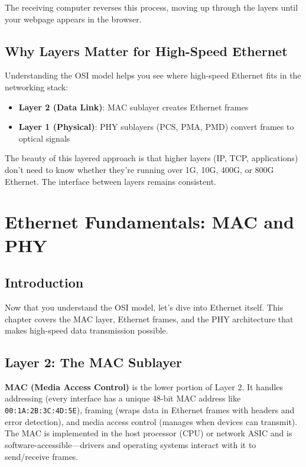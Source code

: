\documentclass[openany]{tufte-book}
\begin{document}
The receiving computer reverses this process, moving up through the layers until your webpage appears in the browser.

\section{Why Layers Matter for High-Speed Ethernet}

Understanding the OSI model helps you see where high-speed Ethernet fits in the networking stack:

\begin{itemize}
\item \textbf{Layer 2 (Data Link)}: MAC sublayer creates Ethernet frames
\item \textbf{Layer 1 (Physical)}: PHY sublayers (PCS, PMA, PMD) convert frames to optical signals
\end{itemize}

The beauty of this layered approach is that higher layers (IP, TCP, applications) don't need to know whether they're running over 1G, 10G, 400G, or 800G Ethernet. The interface between layers remains consistent.


\chapter{Ethernet Fundamentals: MAC and PHY}

\section{Introduction}

Now that you understand the OSI model, let's dive into Ethernet itself. This chapter covers the MAC layer, Ethernet frames, and the PHY architecture that makes high-speed data transmission possible.

\section{Layer 2: The MAC Sublayer}

\textbf{MAC (Media Access Control)} is the lower portion of Layer 2. It handles addressing (every interface has a unique 48-bit MAC address like \texttt{00:1A:2B:3C:4D:5E}), framing (wraps data in Ethernet frames with headers and error detection), and media access control (manages when devices can transmit). The MAC is implemented in the host processor (CPU) or network ASIC and is software-accessible---drivers and operating systems interact with it to send/receive frames.
\end{document}
